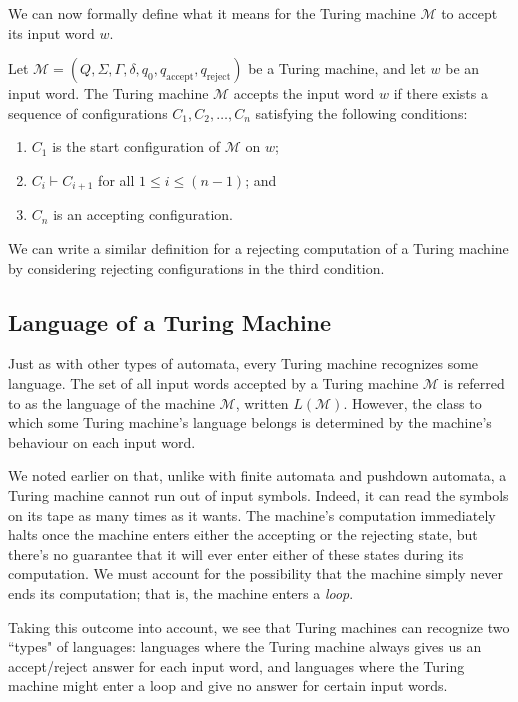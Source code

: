 We can now formally define what it means for the Turing machine $\mathcal{M}$ to accept its input word $w$.

\begin{definition}
Let $\mathcal{M} = (Q, \Sigma, \Gamma, \delta, q_{0}, q_{\text{accept}}, q_{\text{reject}})$ be a Turing machine, and let $w$ be an input word. The Turing machine $\mathcal{M}$ accepts the input word $w$ if there exists a sequence of configurations $C_{1}, C_{2}, \dots, C_{n}$ satisfying the following conditions:
\begin{enumerate}
\item $C_{1}$ is the start configuration of $\mathcal{M}$ on $w$;
\item $C_{i} \vdash C_{i+1}$ for all $1 \leq i \leq (n-1)$; and
\item $C_{n}$ is an accepting configuration.
\end{enumerate}
\end{definition}

We can write a similar definition for a rejecting computation of a Turing machine by considering rejecting configurations in the third condition.

\subsection{Language of a Turing Machine}

Just as with other types of automata, every Turing machine recognizes some language. The set of all input words accepted by a Turing machine $\mathcal{M}$ is referred to as the language of the machine $\mathcal{M}$, written $L(\mathcal{M})$. However, the class to which some Turing machine's language belongs is determined by the machine's behaviour on each input word.

We noted earlier on that, unlike with finite automata and pushdown automata, a Turing machine cannot run out of input symbols. Indeed, it can read the symbols on its tape as many times as it wants. The machine's computation immediately halts once the machine enters either the accepting or the rejecting state, but there's no guarantee that it will ever enter either of these states during its computation. We must account for the possibility that the machine simply never ends its computation; that is, the machine enters a \emph{loop}.

Taking this outcome into account, we see that Turing machines can recognize two ``types" of languages: languages where the Turing machine always gives us an accept/reject answer for each input word, and languages where the Turing machine might enter a loop and give no answer for certain input words.

